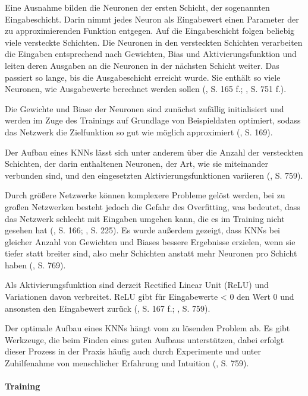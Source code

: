 Eine Ausnahme bilden die Neuronen der ersten Schicht, der sogenannten Eingabeschicht. Darin nimmt jedes Neuron als Eingabewert einen Parameter der zu approximierenden Funktion entgegen. Auf die Eingabeschicht folgen beliebig viele versteckte Schichten. Die Neuronen in den versteckten Schichten verarbeiten die Eingaben entsprechend nach Gewichten, Bias und Aktivierungsfunktion und leiten deren Ausgaben an die Neuronen in der nächsten Schicht weiter. Das passiert so lange, bis die Ausgabeschicht erreicht wurde. Sie enthält so viele Neuronen, wie Ausgabewerte berechnet werden sollen (\cite{Albrecht.2024}, S. 165 f.; \cite{Russell.2020}, S. 751 f.).

Die Gewichte und Biase der Neuronen sind zunächst zufällig initialisiert und werden im Zuge des Trainings auf Grundlage von Beispieldaten optimiert, sodass das Netzwerk die Zielfunktion so gut wie möglich approximiert (\cite{Albrecht.2024}, S. 169).


Der Aufbau eines KNNs lässt sich unter anderem über die Anzahl der versteckten Schichten, der darin enthaltenen Neuronen, der Art, wie sie miteinander verbunden sind, und den eingesetzten Aktivierungsfunktionen variieren (\cite{Russell.2020}, S. 759).

Durch größere Netzwerke können komplexere Probleme gelöst werden, bei zu großen Netzwerken besteht jedoch die Gefahr des Overfitting, was bedeutet, dass das Netzwerk schlecht mit Eingaben umgehen kann, die es im Training nicht gesehen hat (\cite{Albrecht.2024}, S. 166; \cite{Sutton.2018}, S. 225). Es wurde außerdem gezeigt, dass KNNs bei gleicher Anzahl von Gewichten und Biases bessere Ergebnisse erzielen, wenn sie tiefer statt breiter sind, also mehr Schichten anstatt mehr Neuronen pro Schicht haben (\cite{Russell.2020}, S. 769).

Als Aktivierungsfunktion sind derzeit Rectified Linear Unit (ReLU) und Variationen davon verbreitet. ReLU gibt für Eingabewerte < 0 den Wert 0 und ansonsten den Eingabewert zurück (\cite{Albrecht.2024}, S. 167 f.; \cite{Russell.2020}, S. 759).

Der optimale Aufbau eines KNNs hängt vom zu lösenden Problem ab. Es gibt Werkzeuge, die beim Finden eines guten Aufbaus unterstützen, dabei erfolgt dieser Prozess in der Praxis häufig auch durch Experimente und unter Zuhilfenahme von menschlicher Erfahrung und Intuition (\cite{Russell.2020}, S. 759).

\paragraph{Training}

